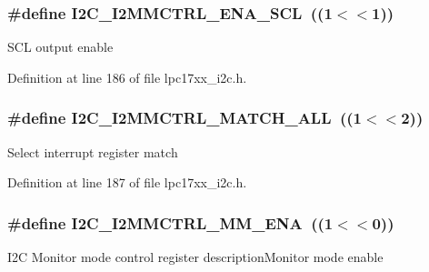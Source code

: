 \subsubsection[{\texorpdfstring{I2\+C\+\_\+\+I2\+M\+M\+C\+T\+R\+L\+\_\+\+E\+N\+A\+\_\+\+S\+CL}{I2C_I2MMCTRL_ENA_SCL}}]{\setlength{\rightskip}{0pt plus 5cm}\#define I2\+C\+\_\+\+I2\+M\+M\+C\+T\+R\+L\+\_\+\+E\+N\+A\+\_\+\+S\+CL~((1$<$$<$1))}\hypertarget{group___i2_c___private___macros_gabf11567c27c48d795ba0f92cf636dab6}{}\label{group___i2_c___private___macros_gabf11567c27c48d795ba0f92cf636dab6}
S\+CL output enable 

Definition at line 186 of file lpc17xx\+\_\+i2c.\+h.

\subsubsection[{\texorpdfstring{I2\+C\+\_\+\+I2\+M\+M\+C\+T\+R\+L\+\_\+\+M\+A\+T\+C\+H\+\_\+\+A\+LL}{I2C_I2MMCTRL_MATCH_ALL}}]{\setlength{\rightskip}{0pt plus 5cm}\#define I2\+C\+\_\+\+I2\+M\+M\+C\+T\+R\+L\+\_\+\+M\+A\+T\+C\+H\+\_\+\+A\+LL~((1$<$$<$2))}\hypertarget{group___i2_c___private___macros_gac7dd5efba503dd79c6b42f3575f70307}{}\label{group___i2_c___private___macros_gac7dd5efba503dd79c6b42f3575f70307}
Select interrupt register match 

Definition at line 187 of file lpc17xx\+\_\+i2c.\+h.

\subsubsection[{\texorpdfstring{I2\+C\+\_\+\+I2\+M\+M\+C\+T\+R\+L\+\_\+\+M\+M\+\_\+\+E\+NA}{I2C_I2MMCTRL_MM_ENA}}]{\setlength{\rightskip}{0pt plus 5cm}\#define I2\+C\+\_\+\+I2\+M\+M\+C\+T\+R\+L\+\_\+\+M\+M\+\_\+\+E\+NA~((1$<$$<$0))}\hypertarget{group___i2_c___private___macros_ga8dc8fa566a5113c3e1b35c0580d90d9f}{}\label{group___i2_c___private___macros_ga8dc8fa566a5113c3e1b35c0580d90d9f}
I2C Monitor mode control register description\+Monitor mode enable 

